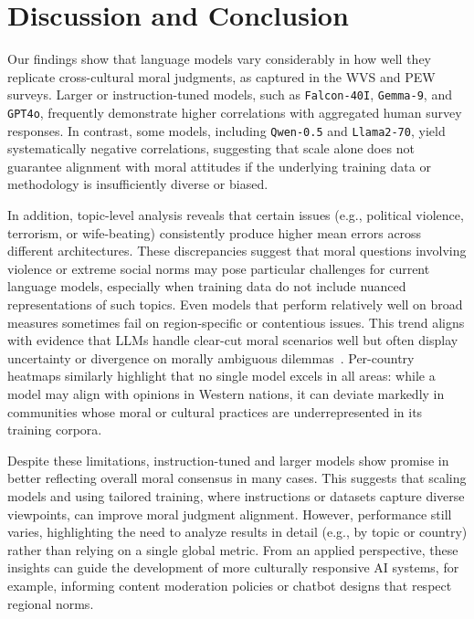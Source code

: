 \documentclass[11pt]{article}
\begin{document}
\section{Discussion and Conclusion}
\label{sec:discussion_Conclusion}

Our findings show that language models vary considerably in how well they replicate cross-cultural moral judgments, as captured in the WVS and PEW surveys. Larger or instruction-tuned models, such as \texttt{Falcon-40I}, \texttt{Gemma-9}, and \texttt{GPT4o}, frequently demonstrate higher correlations with aggregated human survey responses. In contrast, some models, including \texttt{Qwen-0.5} and \texttt{Llama2-70}, yield systematically negative correlations, suggesting that scale alone does not guarantee alignment with moral attitudes if the underlying training data or methodology is insufficiently diverse or biased.

In addition, topic-level analysis reveals that certain issues (e.g., political violence, terrorism, or wife-beating) consistently produce higher mean errors across different architectures. These discrepancies suggest that moral questions involving violence or extreme social norms may pose particular challenges for current language models, especially when training data do not include nuanced representations of such topics. Even models that perform relatively well on broad measures sometimes fail on region-specific or contentious issues. This trend aligns with evidence that LLMs handle clear-cut moral scenarios well but often display uncertainty or divergence on morally ambiguous dilemmas~\citep{scherrer2023evaluating}. Per-country heatmaps similarly highlight that no single model excels in all areas: while a model may align with opinions in Western nations, it can deviate markedly in communities whose moral or cultural practices are underrepresented in its training corpora.

Despite these limitations, instruction-tuned and larger models show promise in better reflecting overall moral consensus in many cases. This suggests that scaling models and using tailored training, where instructions or datasets capture diverse viewpoints, can improve moral judgment alignment. However, performance still varies, highlighting the need to analyze results in detail (e.g., by topic or country) rather than relying on a single global metric. From an applied perspective, these insights can guide the development of more culturally responsive AI systems, for example, informing content moderation policies or chatbot designs that respect regional norms.
\end{document}
